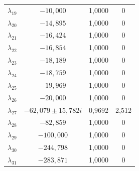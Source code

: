 \begin{longtable}{>{\centering\arraybackslash}m{1.5cm} c c c}
	$\lambda_{19}$ & $-10{,}000$                 & 1,0000 & 0 \\
	$\lambda_{20}$ & $-14{,}895$                 & 1,0000 & 0 \\
	$\lambda_{21}$ & $-16{,}424$                 & 1,0000 & 0 \\
	$\lambda_{22}$ & $-16{,}854$                 & 1,0000 & 0 \\
	$\lambda_{23}$ & $-18{,}189$                 & 1,0000 & 0 \\
	$\lambda_{24}$ & $-18{,}759$                 & 1,0000 & 0 \\
	$\lambda_{25}$ & $-19{,}969$                 & 1,0000 & 0 \\
	$\lambda_{26}$ & $-20{,}000$                 & 1,0000 & 0 \\
	$\lambda_{27}$ & $-62{,}079 \pm 15{,}782i$   & 0,9692 & 2,512 \\
	$\lambda_{28}$ & $-82{,}859$                 & 1,0000 & 0 \\
	$\lambda_{29}$ & $-100{,}000$                & 1,0000 & 0 \\
	$\lambda_{30}$ & $-244{,}798$                & 1,0000 & 0 \\
	$\lambda_{31}$ & $-283{,}871$                & 1,0000 & 0 \\
\end{longtable}
\par
\endgroup

